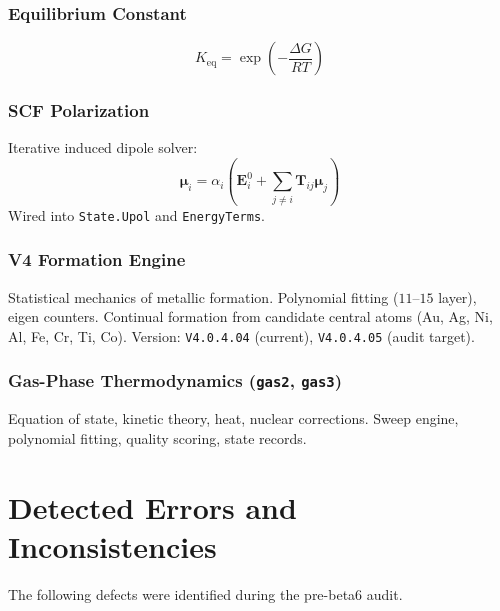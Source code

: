 \documentclass[11pt,a4paper]{article}
\begin{document}
\subsubsection{Equilibrium Constant}
\[
K_{\mathrm{eq}} = \exp\!\left(-\frac{\Delta G}{RT}\right)
\]

\subsubsection{SCF Polarization}
Iterative induced dipole solver:
\[
\boldsymbol{\mu}_i = \alpha_i \left(\mathbf{E}^0_i + \sum_{j \neq i} \mathbf{T}_{ij}\boldsymbol{\mu}_j \right)
\]
Wired into \texttt{State.Upol} and \texttt{EnergyTerms}.

\subsubsection{V4 Formation Engine}
Statistical mechanics of metallic formation.
Polynomial fitting ($11$--$15$ layer), eigen counters.
Continual formation from candidate central atoms (Au, Ag, Ni, Al, Fe, Cr, Ti, Co).
Version: \texttt{V4.0.4.04} (current), \texttt{V4.0.4.05} (audit target).

\subsubsection{Gas-Phase Thermodynamics (\texttt{gas2}, \texttt{gas3})}
Equation of state, kinetic theory, heat, nuclear corrections.
Sweep engine, polynomial fitting, quality scoring, state records.

\section{Detected Errors and Inconsistencies}
\label{sec:errors}

The following defects were identified during the pre-beta6 audit.
\end{document}

